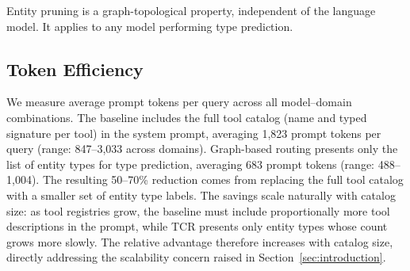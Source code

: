 Entity pruning is a graph-topological property, independent of the language model.
It applies to any model performing type prediction.


\subsection{Token Efficiency}
\label{sec:token-efficiency}

We measure average prompt tokens per query across all model--domain combinations.
The baseline includes the full tool catalog (name and typed signature per tool) in the system prompt, averaging 1,823 prompt tokens per query (range: 847--3,033 across domains).
Graph-based routing presents only the list of entity types for type prediction, averaging 683 prompt tokens (range: 488--1,004).
The resulting 50--70\% reduction comes from replacing the full tool catalog with a smaller set of entity type labels.
The savings scale naturally with catalog size: as tool registries grow, the baseline must include proportionally more tool descriptions in the prompt, while TCR presents only entity types whose count grows more slowly.
The relative advantage therefore increases with catalog size, directly addressing the scalability concern raised in Section~\ref{sec:introduction}.
